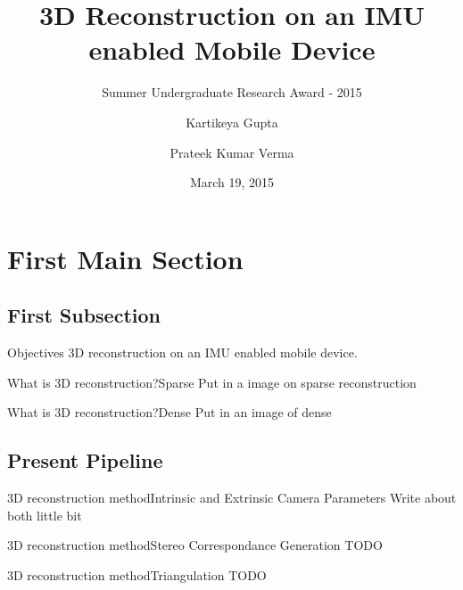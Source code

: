 \documentclass{beamer}
\title[3D reconstruction]{3D Reconstruction on an IMU enabled Mobile Device}
\subtitle{Summer Undergraduate Research Award - 2015}
\author[Kartikeya \and Prateek]{Kartikeya Gupta \and Prateek Kumar Verma}
\institute[IITD] %
{
  Department of Computer Science and Engineering\\
  IIT Delhi
  \and
  Prof. Subhashis Banerjee \\
  Department of Computer Science and Engineering
}
\date{March 19, 2015}
\begin{document}
\begin{frame}
  \titlepage
\end{frame}


\section{First Main Section}

\subsection{First Subsection}

\begin{frame}{Objectives}{}
  3D reconstruction on an IMU enabled mobile device.
\end{frame}

\begin{frame}{What is 3D reconstruction?}{Sparse}
  Put in a image on sparse reconstruction
\end{frame}

\begin{frame}{What is 3D reconstruction?}{Dense}
  Put in an image of dense
\end{frame}

\subsection{Present Pipeline}

\begin{frame}{3D reconstruction method}{Intrinsic and Extrinsic Camera Parameters}
  Write about both little bit
\end{frame}

\begin{frame}{3D reconstruction method}{Stereo Correspondance Generation}
  TODO
\end{frame}

\begin{frame}{3D reconstruction method}{Triangulation}
  TODO
\end{frame}
\end{document}
